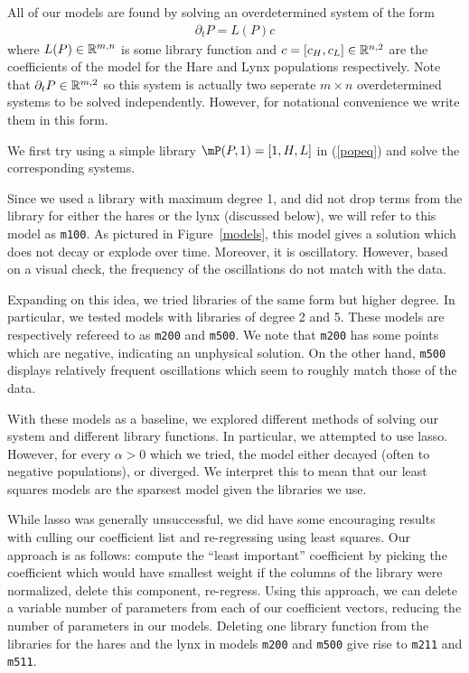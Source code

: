 \documentclass[10pt]{article}
\begin{document}
All of our models are found by solving an overdetermined system of the form
\begin{align}
    \partial_t P = L(P) c \label{popeq}
\end{align}
where \( L(P)\in\mathbb{R}^{m,n} \) is some library function and \(c = [c_H, c_L] \in \mathbb{R}^{n,2} \) are the coefficients of the model for the Hare and Lynx populations respectively. Note that \( \partial_t P \in \mathbb{R}^{m,2} \) so this system is actually two seperate \( m\times n \) overdetermined systems to be solved independently. However, for notational convenience we write them in this form.

We first try using a simple library \( \mP(P,1) = [1, H, L] \) in (\ref{popeq}) and solve the corresponding systems.

Since we used a library with maximum degree 1, and did not drop terms from the library for either the hares or the lynx (discussed below), we will refer to this model as {\tt  m100}. As pictured in Figure~\ref{models}, this model gives a solution which does not decay or explode over time. Moreover, it is oscillatory. However, based on a visual check, the frequency of the oscillations do not match with the data.

Expanding on this idea, we tried libraries of the same form but higher degree. In particular, we tested models with libraries of degree 2 and 5. These models are respectively refereed to as {\tt m200} and {\tt m500}. We note that {\tt m200} has some points which are negative, indicating an unphysical solution. On the other hand, {\tt m500} displays relatively frequent oscillations which seem to roughly match those of the data.

With these models as a baseline, we explored different methods of solving our system and different library functions. In particular, we attempted to use lasso. However, for every \( \alpha > 0 \) which we tried, the model either decayed (often to negative populations), or diverged. We interpret this to mean that our least squares models are the sparsest model given the libraries we use.

While lasso was generally unsuccessful, we did have some encouraging results with culling our coefficient list and re-regressing using least squares. Our approach is as follows: compute the ``least important'' coefficient by picking the coefficient which would have smallest weight if the columns of the library were normalized, delete this component, re-regress. Using this approach, we can delete a variable number of parameters from each of our coefficient vectors, reducing the number of parameters in our models. Deleting one library function from the libraries for the hares and the lynx in models {\tt m200} and {\tt m500} give rise to {\tt m211} and {\tt m511}.
\end{document}
